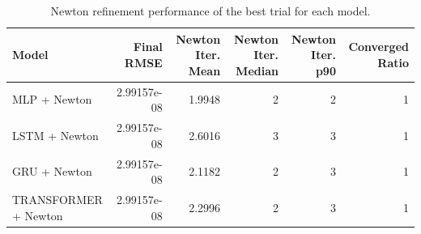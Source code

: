 \begin{table}
\caption{Newton refinement performance of the best trial for each model.}
\label{tab:newton_best_by_model}
\begin{tabular}{lrrrrr}
\toprule
Model & Final RMSE & Newton Iter. Mean & Newton Iter. Median & Newton Iter. p90 & Converged Ratio \\
\midrule
MLP + Newton & 2.99157e-08 & 1.9948 & 2 & 2 & 1 \\
LSTM + Newton & 2.99157e-08 & 2.6016 & 3 & 3 & 1 \\
GRU + Newton & 2.99157e-08 & 2.1182 & 2 & 3 & 1 \\
TRANSFORMER + Newton & 2.99157e-08 & 2.2996 & 2 & 3 & 1 \\
\bottomrule
\end{tabular}
\end{table}
